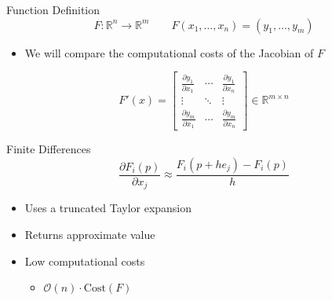 \documentclass{beamer}
\begin{document}
\begin{frame}{Function Definition}
    \begin{equation*}
            F: \mathbb{R}^n \longrightarrow \mathbb{R}^m \qquad
            F(x_1, \ldots, x_n) = (y_1, \ldots, y_m)
    \end{equation*}

    \begin{itemize}
        \item We will compare the computational costs of the Jacobian of $F$
    \end{itemize}
    
    \begin{equation*} \label{jacobian}
        F'(x) = \begin{bmatrix}
            \frac{\partial y_1}{\partial x_1} & \cdots & \frac{\partial y_1}{\partial x_n} \\
            \vdots & \ddots & \vdots \\
            \frac{\partial y_m}{\partial x_1} & \cdots & \frac{\partial y_m}{\partial x_n}
        \end{bmatrix} \in \mathbb{R}^{m \times n}
    \end{equation*}
\end{frame}


\begin{frame}{Finite Differences}
    \begin{equation*}
        \frac{\partial F_i (p)}{\partial x_j} \approx \frac{F_i(p+he_j) - F_i(p)}{h}
    \end{equation*}
    \begin{itemize}
        \item Uses a truncated Taylor expansion 
        \item Returns \alert{approximate} value
        \item Low computational costs
        \begin{itemize}
            \item $\mathcal{O}(n) \cdot \text{Cost}(F)$
        \end{itemize}
    \end{itemize}
\end{frame}
\end{document}
